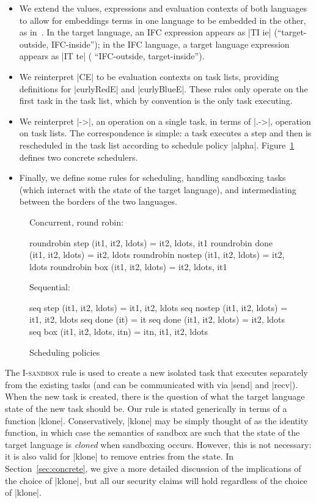 \begin{itemize}
    \item We extend the values, expressions and evaluation contexts of
      both languages to allow for embeddings terms in one language to
      be embedded in the other, as
      in~\cite{Matthews:2007:OSM:1190216.1190220}.
In the target language, an IFC expression appears as |TI ie| (``target-outside,
IFC-inside''); in the IFC language, a target language expression appears as |IT
te| ( ``IFC-outside, target-inside'').
    \item We reinterpret |CE| to be evaluation contexts on task lists, providing definitions for |curlyRedE| and |curlyBlueE|.  These rules only operate on the first task in the task list, which by convention is the only task executing.
    \item We reinterpret |->|, an operation on a single task, in terms of |.->|, operation on task lists.  The correspondence is simple: a task executes a step and then is rescheduled in the task list according to schedule policy |alpha|.
    Figure~\ref{fig:scheduler} defines two concrete schedulers.
    \item Finally, we define some rules for scheduling, handling sandboxing tasks (which interact with the state of the target language),
    and intermediating between the borders of the two languages.
\end{itemize}

\begin{figure}
  Concurrent, round robin:
\begin{code}
  roundrobin step (it1, it2, ldots)    = it2, ldots, it1
  roundrobin done (it1, it2, ldots)    = it2, ldots
  roundrobin nostep (it1, it2, ldots)  = it2, ldots
  roundrobin box (it1, it2, ldots)     = it2, ldots, it1
\end{code}
  Sequential:
\begin{code}
  seq step (it1, it2, ldots)      = it1, it2, ldots
  seq nostep (it1, it2, ldots)    = it1, it2, ldots
  seq done (it)                   = it
  seq done (it1, it2, ldots)      = it2, ldots
  seq box (it1, it2, ldots, itn)  = itn, it1, it2, ldots
\end{code}
\caption{Scheduling policies}
\label{fig:scheduler}
\end{figure}

The \textsc{I-sandbox} rule is used to create a new isolated task that
executes separately from the existing tasks (and can be communicated
with via |send| and |recv|).  When the new task is created, there
is the question of what the target language state of the new task should
be.  Our rule is stated generically in terms of a function |klone|.
Conservatively, |klone| may be simply thought of as the identity
function, in which
case the semantics of sandbox are such that the state of the target language is \emph{cloned}
when sandboxing occurs.  However, this is not necessary: it is also valid for |klone|
to remove entries from the state.  In Section~\ref{sec:concrete}, we give a more detailed
discussion of the implications of the choice of |klone|, but all our
security claims will hold regardless of the choice of |klone|.


